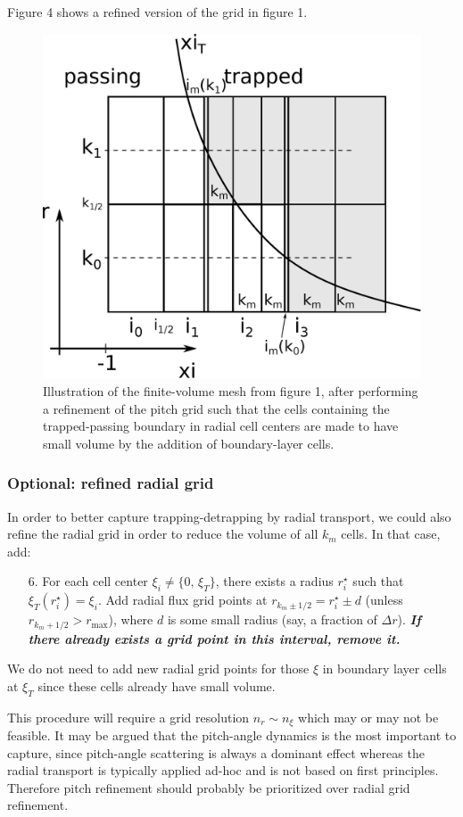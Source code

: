 \documentclass[11pt,a4paper]{article}
\newcommand{\sub}[1]{\ensuremath{_{\text{#1}}}}
\begin{document}
Figure 4 shows a refined version of the grid in figure 1.

\begin{figure}
\begin{center}
\includegraphics[width=1.0\textwidth,trim=10mm 0 10mm 0]{trappedbc_fig_refined}
\caption{Illustration of the finite-volume mesh from figure 1, after performing a refinement of the pitch grid such that the cells containing the trapped-passing boundary in radial cell centers are made to have small volume by the addition of boundary-layer cells. }
\end{center}
\end{figure}

\subsubsection*{Optional: refined radial grid}
In order to better capture trapping-detrapping by radial transport, we could also refine the radial grid in order to reduce the volume of all $k_m$ cells. In that case, add:
\begin{enumerate}
\item[6.] For each cell center $\xi_i \neq \{0,\,\xi_T\}$, there exists a radius $r^\star_i$ such that $\xi_T(r^\star_i) = \xi_i$. Add radial flux grid points at $r_{k_m \pm 1/2} = r^\star_i \pm d$ (unless $r_{k_m+1/2}>r\sub{max}$), where $d$ is some small radius (say, a fraction of $\Delta r$). {\bf \emph{If there already exists a grid point in this interval, remove it.}}
\end{enumerate} 
We do not need to add new radial grid points for those $\xi$ in boundary layer cells at $\xi_T$ since these cells already have small volume.

This procedure will require a grid resolution $n_r \sim n_\xi$ which may or may not be feasible. It may be argued that the pitch-angle dynamics is the most important to capture, since pitch-angle scattering is always a dominant effect whereas the radial transport is typically applied ad-hoc and is not based on first principles. Therefore pitch refinement should probably be prioritized over radial grid refinement.
\end{document}
